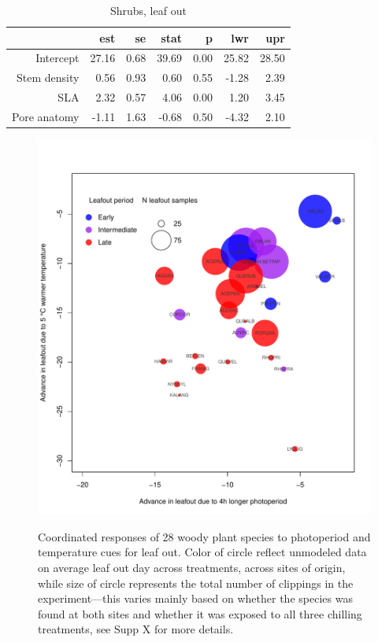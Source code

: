 \documentclass[11pt]{article}
\begin{document}
\begin{table}[ht]
\centering
\caption{Shrubs, leaf out} 
\begin{tabular}{rrrrrrr}
  \hline
 & est & se & stat & p & lwr & upr \\ 
  \hline
Intercept & 27.16 & 0.68 & 39.69 & 0.00 & 25.82 & 28.50 \\ 
  Stem density & 0.56 & 0.93 & 0.60 & 0.55 & -1.28 & 2.39 \\ 
  SLA & 2.32 & 0.57 & 4.06 & 0.00 & 1.20 & 3.45 \\ 
  Pore anatomy & -1.11 & 1.63 & -0.68 & 0.50 & -4.32 & 2.10 \\ 
   \hline
\end{tabular}
\end{table}

\begin{figure} %
\begin{center}
\caption{Coordinated responses of 28 woody plant species to photoperiod and temperature cues for leaf out. Color of circle reflect unmodeled data on average leaf out day across treatments, across sites of origin, while size of circle represents the total number of clippings in the experiment---this varies mainly based on whether the species was found at both sites and whether it was exposed to all three chilling treatments, see Supp X for more details.} %
\includegraphics[scale=0.5]{Advplot2}
\label{fig1}
\end{center}
\end{figure}
\end{document}
